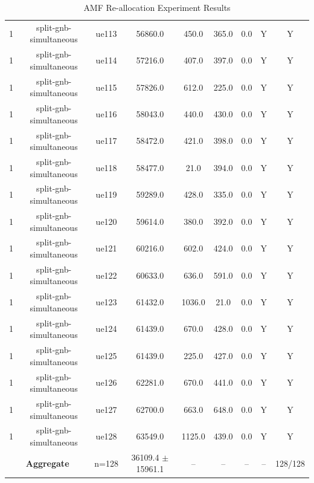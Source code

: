 \begin{table}[ht]
\begin{tabular}{|c|c|c|c|c|c|c|c|c|}
1 & split-gnb-simultaneous & ue113 & 56860.0 & 450.0 & 365.0 & 0.0 & Y & Y \\
1 & split-gnb-simultaneous & ue114 & 57216.0 & 407.0 & 397.0 & 0.0 & Y & Y \\
1 & split-gnb-simultaneous & ue115 & 57826.0 & 612.0 & 225.0 & 0.0 & Y & Y \\
1 & split-gnb-simultaneous & ue116 & 58043.0 & 440.0 & 430.0 & 0.0 & Y & Y \\
1 & split-gnb-simultaneous & ue117 & 58472.0 & 421.0 & 398.0 & 0.0 & Y & Y \\
1 & split-gnb-simultaneous & ue118 & 58477.0 & 21.0 & 394.0 & 0.0 & Y & Y \\
1 & split-gnb-simultaneous & ue119 & 59289.0 & 428.0 & 335.0 & 0.0 & Y & Y \\
1 & split-gnb-simultaneous & ue120 & 59614.0 & 380.0 & 392.0 & 0.0 & Y & Y \\
1 & split-gnb-simultaneous & ue121 & 60216.0 & 602.0 & 424.0 & 0.0 & Y & Y \\
1 & split-gnb-simultaneous & ue122 & 60633.0 & 636.0 & 591.0 & 0.0 & Y & Y \\
1 & split-gnb-simultaneous & ue123 & 61432.0 & 1036.0 & 21.0 & 0.0 & Y & Y \\
1 & split-gnb-simultaneous & ue124 & 61439.0 & 670.0 & 428.0 & 0.0 & Y & Y \\
1 & split-gnb-simultaneous & ue125 & 61439.0 & 225.0 & 427.0 & 0.0 & Y & Y \\
1 & split-gnb-simultaneous & ue126 & 62281.0 & 670.0 & 441.0 & 0.0 & Y & Y \\
1 & split-gnb-simultaneous & ue127 & 62700.0 & 663.0 & 648.0 & 0.0 & Y & Y \\
1 & split-gnb-simultaneous & ue128 & 63549.0 & 1125.0 & 439.0 & 0.0 & Y & Y \\
\multicolumn{2}{|c|}{\textbf{Aggregate}} & n=128 & 36109.4 $\pm$ 15961.1 & -- & -- & -- & -- & 128/128 \\
\hline
\end{tabular}
\caption{AMF Re-allocation Experiment Results}
\label{tab:amf_realloc}
\end{table}
